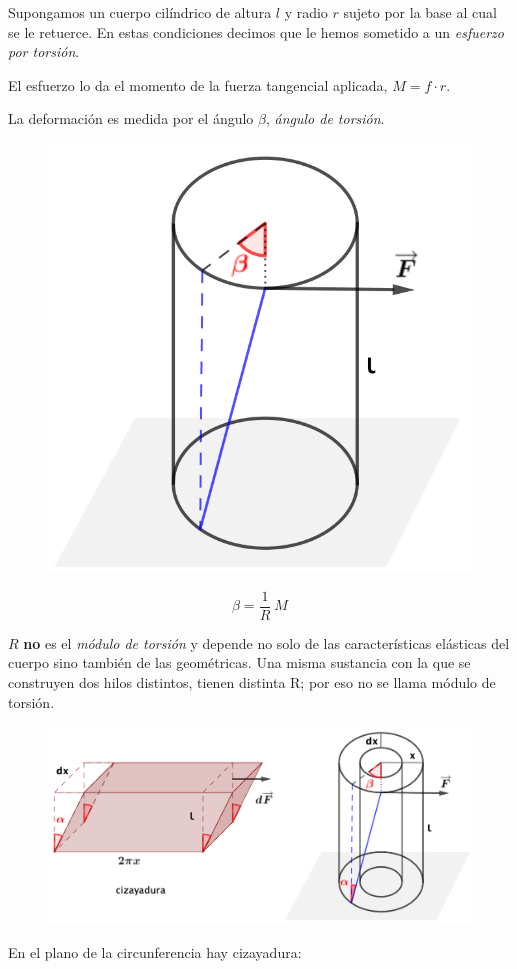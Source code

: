 \begin{multicols}{2}
Supongamos un cuerpo cilíndrico de altura $l$ y radio $r$ sujeto por la base al cual se le retuerce. En estas condiciones decimos que le hemos sometido a un \emph{esfuerzo por torsión}.

El esfuerzo lo da el momento de la fuerza tangencial aplicada, $M=f\cdot r$.

La deformación es medida por el ángulo $\beta$, \emph{ángulo de torsión}.



\begin{figure}[H]
	\centering
	\includegraphics[width=.35\textwidth]{imagenes/imagenes09/T09IM07.png}
\end{figure}		
\end{multicols}

$$ \beta = \dfrac 1 R \ M$$

$R$ \textbf{no} es el \emph{módulo de torsión} y depende no solo de las características elásticas del cuerpo sino también de las geométricas. Una misma sustancia con la que se construyen dos hilos distintos, tienen distinta R; por eso no se llama módulo de torsión.

\begin{figure}[H]
	\centering
	\includegraphics[width=.9\textwidth]{imagenes/imagenes09/T09IM08.png}
\end{figure}	

En el plano de la circunferencia hay cizayadura:

